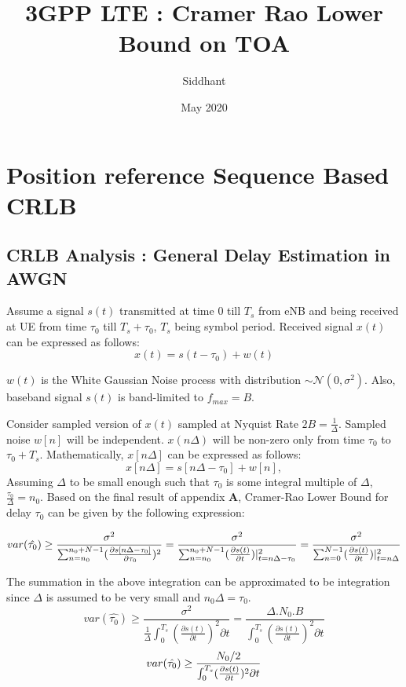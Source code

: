 \documentclass{article}
\title{3GPP LTE : Cramer Rao Lower Bound on TOA}
\author{Siddhant}
\date{May 2020}
\begin{document}
\maketitle
\section{Position reference Sequence Based CRLB}

\subsection{CRLB Analysis : General Delay Estimation in AWGN}
Assume a signal $s(t)$ transmitted at time $0$ till $T_s$ from eNB and being received at UE from time $\tau_0$ till $T_s+\tau_0$, $T_s$ being symbol period. Received signal $x(t)$ can be expressed as follows:
$$x(t) = s(t - \tau_0) + w(t)$$

$w(t)$ is the White Gaussian Noise process with distribution $\sim \mathcal N (0, \sigma^2)$. Also, baseband signal $s(t)$ is band-limited to $f_{max}=B$.

Consider sampled version of $x(t)$ sampled at Nyquist Rate $2B = \frac{1}{\Delta}$. Sampled noise $w[n]$ will be independent. $x(n\Delta)$ will be non-zero only from time $\tau_0$ to $\tau_0 + T_s$. Mathematically, $x[n\Delta]$ can be expressed as follows:
$$x[n\Delta] = s[n\Delta - \tau_0] + w[n],$$
Assuming $\Delta$ to be small enough such that $\tau_0$ is some integral multiple of $\Delta$, $\frac{\tau_0}{\Delta} = n_0$.
Based on the final result of appendix $\mathbf{A}$, Cramer-Rao Lower Bound for delay $\tau_0$ can be given by the following expression:

\begin{equation} \label{eq1} \large
var(\hat{\tau_0}) \ge \frac{\sigma^2}{\sum^{n_0+N-1}_{n=n_0}(\frac{\partial s[n\Delta - \tau_0]}{\partial \tau_0 })^2} = \frac{\sigma^2}{\sum^{n_0+N-1}_{n=n_0}(\frac{\partial s(t)}{\partial t})| ^2 _{t=n\Delta - \tau_0}} = \frac{\sigma^2}{\sum^{N-1}_{n=0}(\frac{\partial s(t)}{\partial t})| ^2 _{t=n\Delta}}
\end{equation}

The summation in the above integration can be approximated to be integration since $\Delta$ is assumed to be very small and $n_0\Delta = \tau_0$. 
$$var(\hat{\tau_0}) \ge \frac{\sigma^2}{\frac{1}{\Delta} \int^{T_s}_{0}(\frac{\partial s(t)}{\partial t})^2 \partial t} = \frac{\Delta. N_0.B}{\int^{T_s}_{0}(\frac{\partial s(t)}{\partial t})^2 \partial t}$$
\begin{equation} \label{eq2} \large
var(\hat{\tau_0}) \ge \frac{N_0/2}{\int^{T_s}_{0}(\frac{\partial s(t)}{\partial t})^2 \partial t}
\end{equation}
\end{document}
